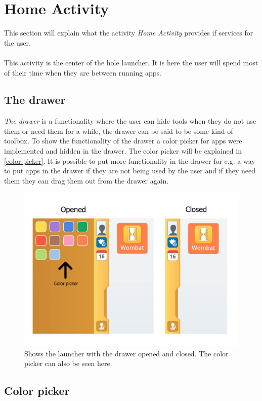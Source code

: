 \section{Home Activity}
This section will explain what the activity \textit{Home Activity} provides if services for the user.\\\\
This activity is the center of the hole launcher. It is here the user will spend most of their time when they are between running apps.

\subsection{The drawer}
\textit{The drawer} is a functionality where the user can hide tools when they do not use them or need them for a while, the drawer can be said to be some kind of toolbox. To show the functionality of the drawer a color picker for apps were implemented and hidden in the drawer. The color picker will be explained in \autoref{color:picker}.
It is possible to put more functionality in the drawer for e.g. a way to put apps in the drawer if they are not being used by the user and if they need them they can drag them out from the drawer again.

\begin{figure}[h!]
	\centering
	\includegraphics[scale=0.3]{gfx/home-activity}
	\caption{Shows the launcher with the drawer opened and closed. The color picker can also be seen here.}
	\label{fig:home-activity}
\end{figure}

\subsection{Color picker}\label{color:picker}

